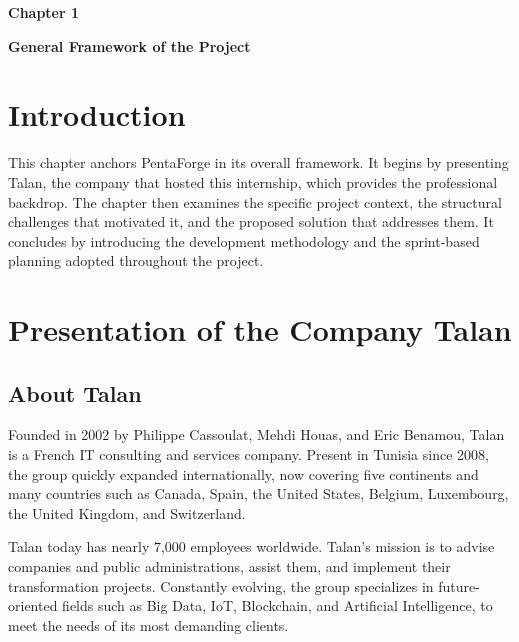\documentclass[12pt,a4paper]{report}
\begin{document}
{\fontsize{26}{30}\selectfont \textbf{Chapter 1}}\par

\vspace{1cm}

{\LARGE\bfseries General Framework of the Project}

\vspace{0.8cm}

\setcounter{chapter}{1}
\setcounter{section}{0}

\section{Introduction}

This chapter anchors PentaForge in its overall framework. It begins by presenting
Talan, the company that hosted this internship, which provides the professional backdrop.
The chapter then examines the specific project context, the structural challenges that
motivated it, and the proposed solution that addresses them. It concludes by introducing
the development methodology and the sprint-based planning adopted throughout the project.

\section{Presentation of the Company Talan}

\subsection{About Talan}

Founded in 2002 by Philippe Cassoulat, Mehdi Houas, and Eric Benamou, Talan is a
French IT consulting and services company. Present in Tunisia since 2008, the group
quickly expanded internationally, now covering five continents and many countries such
as Canada, Spain, the United States, Belgium, Luxembourg, the United Kingdom, and
Switzerland.

Talan today has nearly 7,000 employees worldwide. Talan's mission is to advise
companies and public administrations, assist them, and implement their transformation
projects. Constantly evolving, the group specializes in future-oriented fields such as
Big Data, IoT, Blockchain, and Artificial Intelligence, to meet the needs of its most
demanding clients.
\end{document}
